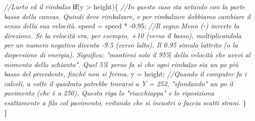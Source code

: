 \documentclass[
]{article}
\newenvironment{Shaded}{}{}
\newcommand{\CommentTok}[1]{\textcolor[rgb]{0.38,0.63,0.69}{\textit{#1}}}
\newcommand{\ControlFlowTok}[1]{\textcolor[rgb]{0.00,0.44,0.13}{\textbf{#1}}}
\newcommand{\FloatTok}[1]{\textcolor[rgb]{0.25,0.63,0.44}{#1}}
\newcommand{\NormalTok}[1]{#1}
\newcommand{\OperatorTok}[1]{\textcolor[rgb]{0.40,0.40,0.40}{#1}}
\begin{document}
\begin{Shaded}
\begin{Highlighting}[]
    \CommentTok{//L\textquotesingle{}urto ed il rimbalzo}
    \ControlFlowTok{if}\OperatorTok{(}\NormalTok{y }\OperatorTok{\textgreater{}}\NormalTok{ height}\OperatorTok{)\{} \CommentTok{//In questo caso sta urtando con la parte bassa della canvas. Quindi deve rimbalzare, e per rimbalzare dobbiamo cambiare il senso della sua velocità.}
\NormalTok{      speed }\OperatorTok{=}\NormalTok{ speed }\OperatorTok{*} \OperatorTok{{-}}\FloatTok{0.95}\OperatorTok{;} \CommentTok{//Il segno Meno ({-}) inverte la direzione. Se la velocità era, per esempio, +10 (verso il basso), moltiplicandola per un numero negativo diventa {-}9.5 (verso l\textquotesingle{}alto). Il 0.95 simula l\textquotesingle{}attrito (o la dispersione di energia). Significa: "mantieni solo il 95\% della velocità che avevi al momento dello schianto". Quel 5\% perso fa sì che ogni rimbalzo sia un po\textquotesingle{} più basso del precedente, finché non si ferma.}
\NormalTok{      y }\OperatorTok{=}\NormalTok{ height}\OperatorTok{;} \CommentTok{//Quando il computer fa i calcoli, a volte il quadrato potrebbe trovarsi a Y = 252, "sfondando" un po\textquotesingle{} il pavimento (che è a 250). Questa riga lo "riacchiappa" e lo riposiziona esattamente a filo col pavimento, evitando che si incastri o faccia scatti strani.}
    \OperatorTok{\}}
\OperatorTok{\}}
\end{Highlighting}
\end{Shaded}
\end{document}
